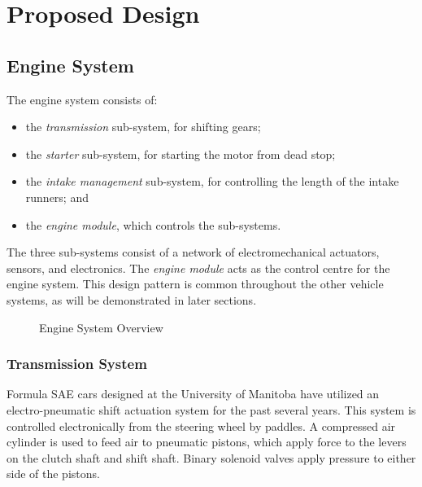 %
%
%
%

\chapter{Proposed Design}

%
%

\section{Engine System}

The engine system consists of:

\begin{itemize}
\item the \emph{transmission} sub-system, for shifting gears;
\item the \emph{starter} sub-system, for starting the motor from dead stop; 
\item the \emph{intake management} sub-system, for controlling the length of the intake runners; and
\item the \emph{engine module}, which controls the sub-systems.
\end{itemize}

The three sub-systems consist of a network of electromechanical actuators, sensors, and electronics. The \emph{engine module} acts as the control centre for the engine system. This design pattern is common throughout the other vehicle systems, as will be demonstrated in later sections.

\begin{figure}[H]
	\centering
		
	\caption{Engine System Overview\label{fig:engine_system_overview}}
\end{figure}

\subsection{Transmission System}

Formula SAE cars designed at the University of Manitoba have utilized an electro-pneumatic shift actuation system for the past several years. This system is controlled electronically from the steering wheel by paddles. A compressed air cylinder is used to feed air to pneumatic pistons, which apply force to the levers on the clutch shaft and shift shaft. Binary solenoid valves apply pressure to either side of the pistons. 

